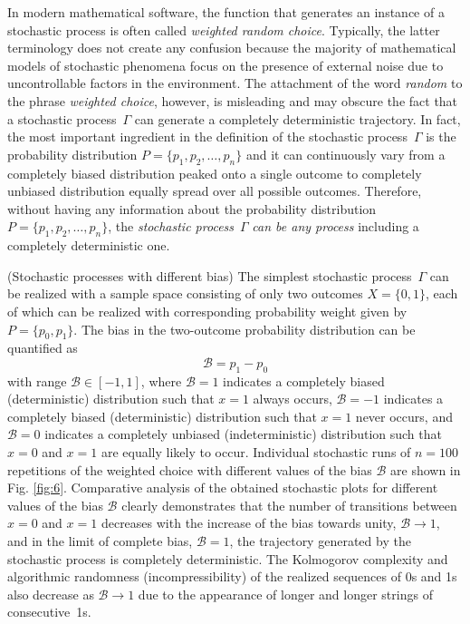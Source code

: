 \documentclass{ws-ijmpb}
\begin{document}
In modern mathematical software, the function that generates an instance
of a stochastic process is often called \emph{weighted random choice}.
Typically, the latter terminology does not create any confusion because
the majority of mathematical models of stochastic phenomena focus
on the presence of external noise due to uncontrollable factors in
the environment. The attachment of the word \emph{random} to the phrase
\emph{weighted choice}, however, is misleading and may obscure the
fact that a stochastic process~$\Gamma$ can generate a completely
deterministic trajectory. In fact, the most important ingredient in
the definition of the stochastic process~$\Gamma$ is the probability
distribution $P=\{p_{1},p_{2},\ldots,p_{n}\}$ and it can continuously
vary from a completely biased distribution peaked onto a single outcome
to completely unbiased distribution equally spread over all possible
outcomes. Therefore, without having any information about the probability
distribution $P=\{p_{1},p_{2},\ldots,p_{n}\}$, the \emph{stochastic
process}~$\Gamma$ \emph{can be any process} including a completely
deterministic one.

\begin{example}
(Stochastic processes with different bias) The simplest stochastic
process~$\Gamma$ can be realized with a sample space consisting of
only two outcomes $X=\{0,1\}$, each of which can be realized with
corresponding probability weight given by $P=\{p_{0},p_{1}\}$. The
bias in the two-outcome probability distribution can be quantified as
\begin{equation}
\mathscr{B}=p_{1}-p_{0}\label{eq:bias}
\end{equation}
with range $\mathscr{B}\in[-1,1]$, where $\mathscr{B}=1$ indicates
a completely biased (deterministic) distribution such that $x=1$
always occurs, $\mathscr{B}=-1$ indicates a completely biased (deterministic)
distribution such that $x=1$ never occurs, and $\mathscr{B}=0$ indicates
a completely unbiased (indeterministic) distribution such that $x=0$
and $x=1$ are equally likely to occur. Individual stochastic runs
of $n=100$ repetitions of the weighted choice with different values
of the bias $\mathscr{B}$ are shown in Fig. \ref{fig:6}.
Comparative analysis of the obtained stochastic plots for different values of
the bias $\mathscr{B}$ clearly demonstrates that the number of transitions
between $x=0$ and $x=1$ decreases with the increase of the bias towards unity, $\mathscr{B}\to1$,
and in the limit of complete bias, $\mathscr{B}=1$,
the trajectory generated by the stochastic process is completely deterministic.
The Kolmogorov complexity and algorithmic randomness (incompressibility)
of the realized sequences of 0s and 1s also decrease as $\mathscr{B}\to1$
due to the appearance of longer and longer strings of consecutive~1s.
\end{example}
\end{document}
